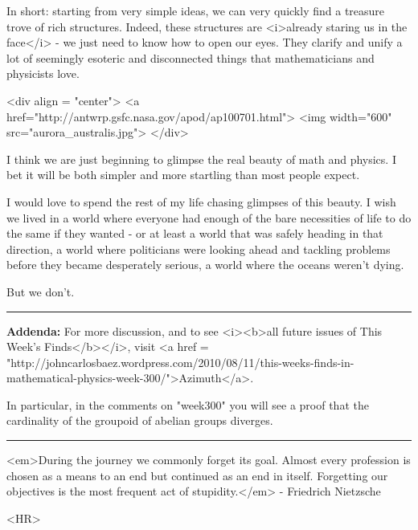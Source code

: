 In short: starting from very simple ideas, we can very quickly find a
treasure trove of rich structures.  Indeed, these structures are
<i>already staring us in the face</i> - we just need to know how to
open our eyes.  They clarify and unify a lot of seemingly esoteric and
disconnected things that mathematicians and physicists love.

<div align = "center">
<a href="http://antwrp.gsfc.nasa.gov/apod/ap100701.html">
<img width="600" src="aurora_australis.jpg">
</div>


I think we are just beginning to glimpse the real beauty of math and
physics. I bet it will be both simpler and more startling than most
people expect.

I would love to spend the rest of my life chasing glimpses of this
beauty.  I wish we lived in a world where everyone had enough of the
bare necessities of life to do the same if they wanted - or at least a
world that was safely heading in that direction, a world where
politicians were looking ahead and tackling problems before they
became desperately serious, a world where the oceans weren't dying.

But we don't. 
\par\noindent\rule{\textwidth}{0.4pt}
\textbf{Addenda:}
For more discussion, and to see <i><b>all future issues of This 
Week's Finds</b></i>, visit <a href = "http://johncarlosbaez.wordpress.com/2010/08/11/this-weeks-finds-in-mathematical-physics-week-300/">Azimuth</a>.

In particular, in the comments on "week300" you will see
a proof that the cardinality of the groupoid of abelian groups diverges.

\par\noindent\rule{\textwidth}{0.4pt}
<em>During the journey we commonly forget its goal. Almost every profession 
is chosen as a means to an end but continued as an end in itself. 
Forgetting our objectives is the most frequent act of stupidity.</em> - 
Friedrich Nietzsche

<HR>



